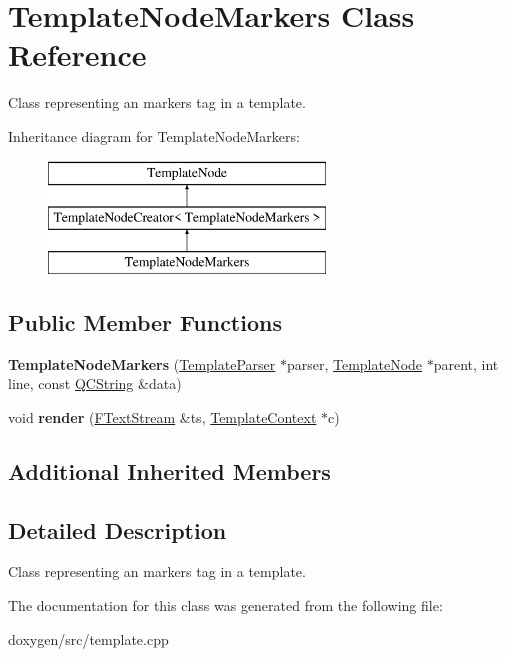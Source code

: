 \hypertarget{class_template_node_markers}{}\section{Template\+Node\+Markers Class Reference}
\label{class_template_node_markers}


Class representing an \textquotesingle{}markers\textquotesingle{} tag in a template.  


Inheritance diagram for Template\+Node\+Markers\+:\begin{figure}[H]
\begin{center}
\leavevmode
\includegraphics[height=3.000000cm]{class_template_node_markers}
\end{center}
\end{figure}
\subsection*{Public Member Functions}
\begin{DoxyCompactItemize}
\item 
\mbox{\label{class_template_node_markers_afe136c58db97dd9ea08bc8f99d812b59}} 
{\bfseries Template\+Node\+Markers} (\mbox{\hyperlink{class_template_parser}{Template\+Parser}} $\ast$parser, \mbox{\hyperlink{class_template_node}{Template\+Node}} $\ast$parent, int line, const \mbox{\hyperlink{class_q_c_string}{Q\+C\+String}} \&data)
\item 
\mbox{\label{class_template_node_markers_a7778a4c719f4990aa9b3fcc8b0f6fae7}} 
void {\bfseries render} (\mbox{\hyperlink{class_f_text_stream}{F\+Text\+Stream}} \&ts, \mbox{\hyperlink{class_template_context}{Template\+Context}} $\ast$c)
\end{DoxyCompactItemize}
\subsection*{Additional Inherited Members}


\subsection{Detailed Description}
Class representing an \textquotesingle{}markers\textquotesingle{} tag in a template. 

The documentation for this class was generated from the following file\+:\begin{DoxyCompactItemize}
\item 
doxygen/src/template.\+cpp\end{DoxyCompactItemize}
